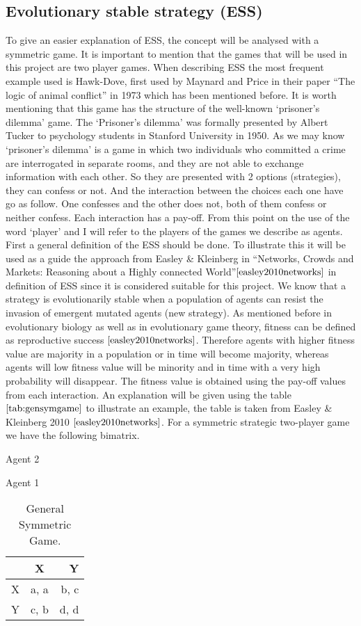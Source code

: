 \subsection{Evolutionary stable strategy (ESS)}\label{EES}
To give an easier explanation of ESS, the concept will be analysed with a symmetric game. It is important to mention that the games that will be used in this project are two player games. 
When describing ESS the most frequent example used is Hawk-Dove, first used by Maynard and Price in their paper ``The logic of animal conflict'' in 1973 which has been mentioned before. It is worth mentioning that this game has the structure of the well-known ‘prisoner's dilemma’ game. The `Prisoner's dilemma’  was formally presented by Albert Tucker to psychology students in Stanford University in 1950. As we may know ‘prisoner’s dilemma’ is a game in which two individuals who committed a crime are interrogated in separate rooms, and they are not able to exchange information with each other. So they are presented with 2 options (strategies), they can confess or not. And the interaction between the choices each one have go as follow. One confesses and the other does not, both of them confess or neither confess. Each interaction has a pay-off. From this point on the use of the word `player' and  I will refer to the players of the games we describe as agents.
First a general definition of the ESS should be done. To illustrate this it will be used as a guide the approach from Easley \& Kleinberg in ``Networks, Crowds and Markets: Reasoning about a Highly connected World''$\cite{easley2010networks}$ in definition of ESS since it is considered suitable for this project.
We know that a strategy is evolutionarily stable when a population of agents can resist the invasion of emergent mutated agents (new strategy). As mentioned before in evolutionary biology as well as in evolutionary game theory, fitness can be defined as reproductive success $\cite{easley2010networks}$. Therefore agents with higher fitness value are majority in a population or in time will become majority, whereas agents will low fitness value will be minority and in time with a very high probability will disappear. The fitness value is obtained using the pay-off values from each interaction. An explanation will be given using the table $\ref{tab:gensymgame}$ to illustrate an example, the table is taken from Easley \& Kleinberg 2010 $\cite{easley2010networks}$.
For a symmetric strategic two-player game we have the following bimatrix.

\begin{table}[h]
\begin{center}
Agent 2

Agent 1
\begin{tabular}{|l|c|r|}
\hline
 & X & Y\\ 
\hline
X & a, a & b, c\\
\hline
Y & c, b & d, d\\
\hline
\end{tabular}
\end{center}
\caption{ General Symmetric Game.}
\label{tab:gensymgame}
\end{table}

